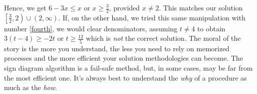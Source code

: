 \documentclass{ximera}
\begin{document}
Hence, we get $6-3x \leq x$ or $x \geq \frac{3}{2}$, provided $x \neq 2$. This matches our solution $\left[\frac{3}{2},2\right) \cup (2, \infty)$.  If, on the other hand, we tried this same manipulation with number \ref{fourth}, we would clear denominators, assuming $t \neq 4$ to obtain $3(t-4) \geq -2t$ or $t \geq \frac{12}{5}$ which is \textit{not} the correct solution.  The moral of the story is the more you understand, the less you need to rely on memorized processes and the more efficient your solution methodologies can become.  The sign diagram algorithm is a fail-safe method, but, in some cases, may be far from the most efficient one.  It's always best to understand the \textit{why} of a procedure as much as the \textit{how}.  




\closegraphsfile
\end{document}
